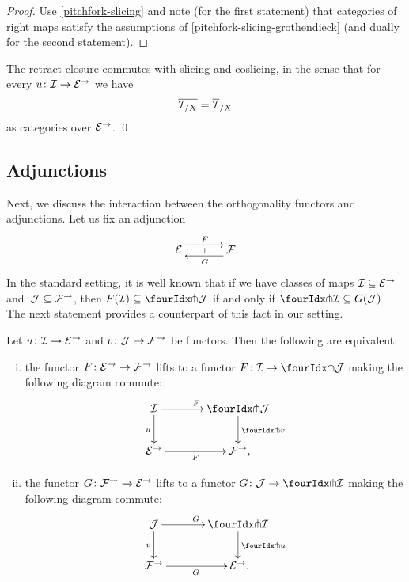 \documentclass[reqno,10pt,a4paper,oneside,draft]{amsart}
\begin{document}
\begin{proof}
Use \cref{pitchfork-slicing} and note (for the first statement) that categories of right maps satisfy the assumptions of \cref{pitchfork-slicing-grothendieck} (and dually for the second statement).
\end{proof}

\begin{proposition}
The retract closure commutes with slicing and coslicing, in the sense that for every $u \co \cal{I} \to \catE^\to$ we have
\[
  \overline{\cal{I}_{/X}} = \overline{\cal{I}}_{/X}
\]
as categories over $\catE^\to$.
\qed
\end{proposition}

\subsection*{Adjunctions}

Next, we discuss the interaction between the orthogonality functors and adjunctions.
Let us fix an adjunction
\[
\xymatrix@C+1em{
  \catE
  \ar@<5pt>[r]^{F}
  \ar@{}[r]|{\bot}
&
  \cal{F}
  \ar@<5pt>[l]^{G}
\rlap{.}}
\]
In the standard setting, it is well known that if we have classes of maps $\cal{I} \subseteq \catE^\to$ and~$\cal{J} \subseteq \cal{F}^\to$, then $F(\cal{I}) \subseteq \liftl{\cal{J}}$ if and only if $\liftr{\cal{I}} \subseteq G(\cal{J})$.
The next statement provides a counterpart of this fact in our setting.

\begin{proposition} \label{lift-of-adjunction}
Let $u \co \cal{I} \to \catE^\to$ and $v \co \cal{J} \to \cal{F}^\to$ be functors.
Then the following are equivalent:
\begin{enumerate}[(i)]
\item the functor $F \co \catE^\to \to \cal{F}^\to$ lifts to a functor $F \co \cal{I} \to \liftl{\cal{J}}$ making the following diagram commute:
\[
\xymatrix@C=1.2cm{
  \cal{I}
  \ar[r]^{F}
  \ar[d]_{u}
&
  \liftl{\cal{J}}
  \ar[d]^{\liftl{v}}
\\
  \catE^\to
  \ar[r]_-{F}
&
  \cal{F}^\to
\rlap{,}}
\]
\item the functor $G \co \cal{F}^\to \to \catE^\to$ lifts to a functor $G \co \cal{J} \to \liftr{\cal{I}}$ making the following diagram commute:
\[
\xymatrix@C=1.2cm{
  \cal{J}
    \ar[d]_{v}
\ar[r]^{G}
&
  \liftr{\cal{I}}
  \ar[d]^{\liftr{u}}
\\
  \cal{F}^\to
   \ar[r]_{G}
&
  \catE^\to
\rlap{.}}
\]
\end{enumerate}
\end{proposition}
\end{document}
